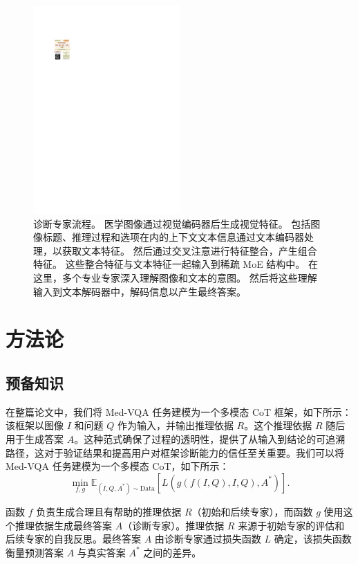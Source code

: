 \documentclass[11pt]{article}
\begin{document}
\begin{figure}[t]
\centering
\includegraphics[width=0.5\textwidth]{image/Figure_3_v7.pdf}
\caption{诊断专家流程。 医学图像通过视觉编码器后生成视觉特征。 包括图像标题、推理过程和选项在内的上下文文本信息通过文本编码器处理，以获取文本特征。 然后通过交叉注意进行特征整合，产生组合特征。 这些整合特征与文本特征一起输入到稀疏 MoE 结构中。 在这里，多个专业专家深入理解图像和文本的意图。 然后将这些理解输入到文本解码器中，解码信息以产生最终答案。 }
\label{Diagnostic}
\vspace{-1em}
\end{figure}
\section{方法论}
\subsection{预备知识}
在整篇论文中，我们将 Med-VQA 任务建模为一个多模态 CoT 框架，如下所示：该框架以图像 \( I \) 和问题 \( Q \) 作为输入，并输出推理依据 \( R \)。这个推理依据 \( R \) 随后用于生成答案 \( A \)。这种范式确保了过程的透明性，提供了从输入到结论的可追溯路径，这对于验证结果和提高用户对框架诊断能力的信任至关重要。我们可以将 Med-VQA 任务建模为一个多模态 CoT，如下所示：
\begin{equation}
    \min_{f, g} \mathbb{E}_{(I, Q, A^*) \sim \text{Data}} \left[ L \left( g \left( f(I, Q), I, Q \right), A^* \right) \right].
\end{equation}

函数 \( f \) 负责生成合理且有帮助的推理依据 \( R \)（初始和后续专家），而函数 \( g \) 使用这个推理依据生成最终答案 \( A \)（诊断专家）。推理依据 \( R \) 来源于初始专家的评估和后续专家的自我反思。最终答案 \( A \) 由诊断专家通过损失函数 \( L \) 确定，该损失函数衡量预测答案 \( A \) 与真实答案 \( A^* \) 之间的差异。
\end{document}
